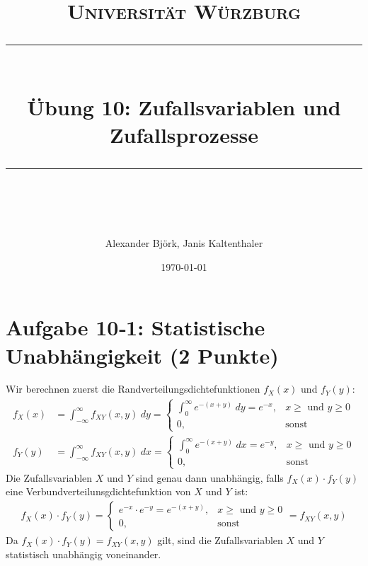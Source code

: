 \documentclass[11pt]{scrartcl} %
\title{	
	\normalfont\normalsize
	\textsc{Universität Würzburg}\\ %
	\vspace{25pt} %
	\rule{\linewidth}{0.5pt}\\ %
	\vspace{20pt} %
	{\huge Übung 10: Zufallsvariablen und Zufallsprozesse}\\ %
	\vspace{12pt} %
	\rule{\linewidth}{2pt}\\ %
	\vspace{12pt} %
}
\author{\LARGE Alexander Björk, Janis Kaltenthaler} %
\date{\normalsize\today} %
\begin{document}
\maketitle %


\section*{Aufgabe 10‐1: Statistische Unabhängigkeit (2 Punkte)} 
Wir berechnen zuerst die Randverteilungsdichtefunktionen $f_X(x)$ und $f_Y(y)$:
\begin{align*}
	f_X(x)&=\int_{-\infty}^{\infty}f_{XY}(x,y)\hspace{3pt}dy=\begin{cases}\int_{0}^{\infty}e^{-(x+y)}\hspace{3pt}dy=e^{-x}, & x\ge\text{ und }y \ge0 \\0, & \text{sonst} \end{cases}\\
	f_Y(y)&=\int_{-\infty}^{\infty}f_{XY}(x,y)\hspace{3pt}dx=\begin{cases}\int_{0}^{\infty}e^{-(x+y)}\hspace{3pt}dx=e^{-y}, & x\ge\text{ und }y \ge0 \\0, & \text{sonst} \end{cases}
\end{align*}
Die Zufallsvariablen $X$ und $Y$ sind genau dann unabhängig, falls $f_X(x)\cdot f_Y(y)$ eine Verbundverteilunsgdichtefunktion von $X$ und $Y$ ist:
\begin{align*}
	f_X(x)\cdot f_Y(y)=\begin{cases}e^{-x}\cdot e^{-y}=e^{-(x+y)}, & x\ge\text{ und }y \ge0 \\0, & \text{sonst} \end{cases}=f_{XY}(x,y)
\end{align*}
Da $f_X(x)\cdot f_Y(y)=f_{XY}(x,y)$ gilt, sind die Zufallsvariablen $X$ und $Y$ statistisch unabhängig voneinander.
\end{document}
